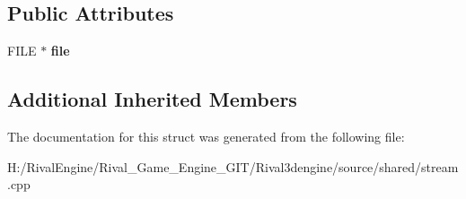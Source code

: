 \subsection*{Public Attributes}
\begin{DoxyCompactItemize}
\item 
\mbox{\label{structfilestream_a86369859a949d0e73414195894ff0aa9}} 
F\+I\+LE $\ast$ {\bfseries file}
\end{DoxyCompactItemize}
\subsection*{Additional Inherited Members}


The documentation for this struct was generated from the following file\+:\begin{DoxyCompactItemize}
\item 
H\+:/\+Rival\+Engine/\+Rival\+\_\+\+Game\+\_\+\+Engine\+\_\+\+G\+I\+T/\+Rival3dengine/source/shared/stream.\+cpp\end{DoxyCompactItemize}
